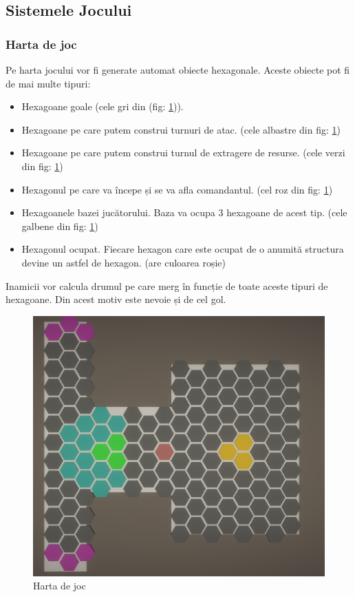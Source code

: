 \documentclass[12pt, a4paper]{article}
\begin{document}
	
	
	
	
	\subsection{Sistemele Jocului}
	
	\subsubsection{Harta de joc}
	
	Pe harta jocului vor fi generate automat obiecte hexagonale. Aceste obiecte pot fi de mai multe tipuri:
	
	\begin{itemize}
		\item Hexagoane goale (cele gri din (fig: \ref{fig: gridSystem})).
		\item Hexagoane pe care putem construi turnuri de atac. (cele albastre din fig: \ref{fig: gridSystem})
		\item Hexagoane pe care putem construi turnul de extragere de resurse. (cele verzi din fig: \ref{fig: gridSystem})
		\item Hexagonul pe care va începe și se va afla comandantul. (cel roz din fig: \ref{fig: gridSystem})
		\item Hexagoanele bazei jucătorului. Baza va ocupa 3 hexagoane de acest tip. (cele galbene din fig: \ref{fig: gridSystem})
		\item Hexagonul ocupat. Fiecare hexagon care este ocupat de o anumită structura devine un astfel de hexagon. (are culoarea roșie)
	\end{itemize}
	
	Inamicii vor calcula drumul pe care merg în funcție de toate aceste tipuri de hexagoane. Din acest motiv este nevoie și de cel gol.
	
	\begin{figure}[H]
		\centering
		\includegraphics[width=1\textwidth]{Map.png}
		\caption{Harta de joc}
		\label{fig: gridSystem}
	\end{figure}
\end{document}

